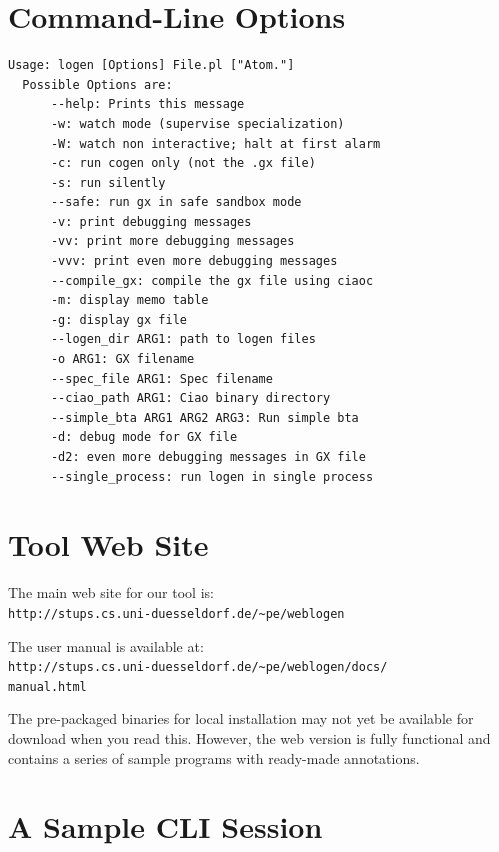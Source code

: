 \documentclass{sig-alternate}
\begin{document}



\newpage

\appendix

\section{Command-Line Options}
 \begin{footnotesize}
\begin{verbatim}
Usage: logen [Options] File.pl ["Atom."]
  Possible Options are:
      --help: Prints this message
      -w: watch mode (supervise specialization)
      -W: watch non interactive; halt at first alarm
      -c: run cogen only (not the .gx file)
      -s: run silently
      --safe: run gx in safe sandbox mode
      -v: print debugging messages
      -vv: print more debugging messages
      -vvv: print even more debugging messages
      --compile_gx: compile the gx file using ciaoc
      -m: display memo table
      -g: display gx file
      --logen_dir ARG1: path to logen files
      -o ARG1: GX filename
      --spec_file ARG1: Spec filename
      --ciao_path ARG1: Ciao binary directory
      --simple_bta ARG1 ARG2 ARG3: Run simple bta
      -d: debug mode for GX file
      -d2: even more debugging messages in GX file
      --single_process: run logen in single process
\end{verbatim}
  \end{footnotesize}
 
\section{Tool Web Site}

\noindent
The main web site for our tool is:\\
{\small\tt http://stups.cs.uni-duesseldorf.de/\~{}pe/weblogen}

\noindent
The user manual is available at:\\
{\small\tt http://stups.cs.uni-duesseldorf.de/\~{}pe/weblogen/docs/ \\
manual.html}

\noindent
The pre-packaged binaries for local installation may not yet be
available for download when you read this.
However, the web version is fully functional and
 contains a series of sample programs with ready-made
 annotations.

\section{A Sample CLI Session}
\end{document}
